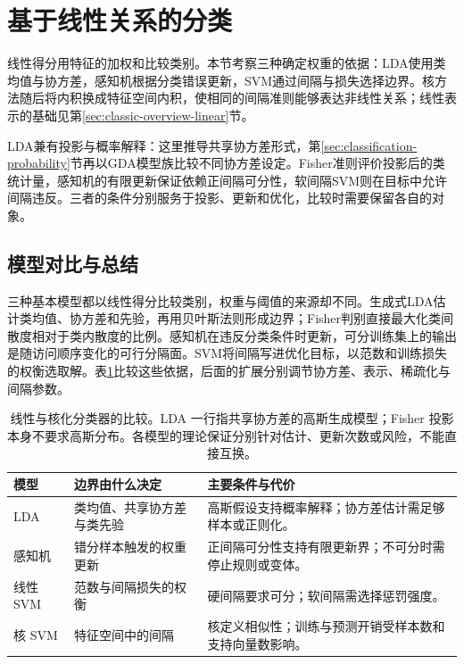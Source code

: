 \section{基于线性关系的分类}
\label{sec:classification-geometry}

线性得分用特征的加权和比较类别。本节考察三种确定权重的依据：LDA使用类均值与协方差，感知机根据分类错误更新，SVM通过间隔与损失选择边界。核方法随后将内积换成特征空间内积，使相同的间隔准则能够表达非线性关系；线性表示的基础见第\ref{sec:classic-overview-linear}节。

LDA兼有投影与概率解释：这里推导共享协方差形式，第\ref{sec:classification-probability}节再以GDA模型族比较不同协方差设定。Fisher准则评价投影后的类统计量，感知机的有限更新保证依赖正间隔可分性，软间隔SVM则在目标中允许间隔违反。三者的条件分别服务于投影、更新和优化，比较时需要保留各自的对象。




\subsection{模型对比与总结}
\label{sec:classification-geometry-summary}

三种基本模型都以线性得分比较类别，权重与阈值的来源却不同。生成式LDA估计类均值、协方差和先验，再用贝叶斯法则形成边界；Fisher判别直接最大化类间散度相对于类内散度的比例。感知机在违反分类条件时更新，可分训练集上的输出是随访问顺序变化的可行分隔面。SVM将间隔写进优化目标，以范数和训练损失的权衡选取解。表\ref{tab:classification-linear-comparison}比较这些依据，后面的扩展分别调节协方差、表示、稀疏化与间隔参数。

\begin{table}[htbp]
  \centering
  \small
  \begin{tabularx}{\linewidth}{@{}>{\RaggedRight\arraybackslash}p{18mm}>{\RaggedRight\arraybackslash}X>{\RaggedRight\arraybackslash}X@{}}
    \toprule
    模型 & 边界由什么决定 & 主要条件与代价 \\
    \midrule
    LDA & 类均值、共享协方差与类先验 & 高斯假设支持概率解释；协方差估计需足够样本或正则化。 \\
    感知机 & 错分样本触发的权重更新 & 正间隔可分性支持有限更新界；不可分时需停止规则或变体。 \\
    线性 SVM & 范数与间隔损失的权衡 & 硬间隔要求可分；软间隔需选择惩罚强度。 \\
    核 SVM & 特征空间中的间隔 & 核定义相似性；训练与预测开销受样本数和支持向量数影响。 \\
    \bottomrule
  \end{tabularx}
  \caption{线性与核化分类器的比较。LDA 一行指共享协方差的高斯生成模型；Fisher 投影本身不要求高斯分布。各模型的理论保证分别针对估计、更新次数或风险，不能直接互换。}
  \label{tab:classification-linear-comparison}
\end{table}

